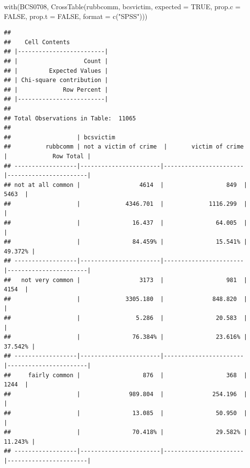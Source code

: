 \documentclass[
]{book}
\newenvironment{Shaded}{\begin{snugshade}}{\end{snugshade}}
\newcommand{\AttributeTok}[1]{\textcolor[rgb]{0.77,0.63,0.00}{#1}}
\newcommand{\ConstantTok}[1]{\textcolor[rgb]{0.00,0.00,0.00}{#1}}
\newcommand{\FunctionTok}[1]{\textcolor[rgb]{0.00,0.00,0.00}{#1}}
\newcommand{\NormalTok}[1]{#1}
\newcommand{\StringTok}[1]{\textcolor[rgb]{0.31,0.60,0.02}{#1}}
\begin{document}
\begin{Shaded}
\begin{Highlighting}[]
\FunctionTok{with}\NormalTok{(BCS0708, }\FunctionTok{CrossTable}\NormalTok{(rubbcomm, bcsvictim, }\AttributeTok{expected =} \ConstantTok{TRUE}\NormalTok{, }\AttributeTok{prop.c =} \ConstantTok{FALSE}\NormalTok{, }\AttributeTok{prop.t =} \ConstantTok{FALSE}\NormalTok{, }\AttributeTok{format =} \FunctionTok{c}\NormalTok{(}\StringTok{"SPSS"}\NormalTok{)))}
\end{Highlighting}
\end{Shaded}

\begin{verbatim}
## 
##    Cell Contents
## |-------------------------|
## |                   Count |
## |         Expected Values |
## | Chi-square contribution |
## |             Row Percent |
## |-------------------------|
## 
## Total Observations in Table:  11065 
## 
##                   | bcsvictim 
##          rubbcomm | not a victim of crime  |       victim of crime  |             Row Total | 
## ------------------|-----------------------|-----------------------|-----------------------|
## not at all common |                 4614  |                  849  |                 5463  | 
##                   |             4346.701  |             1116.299  |                       | 
##                   |               16.437  |               64.005  |                       | 
##                   |               84.459% |               15.541% |               49.372% | 
## ------------------|-----------------------|-----------------------|-----------------------|
##   not very common |                 3173  |                  981  |                 4154  | 
##                   |             3305.180  |              848.820  |                       | 
##                   |                5.286  |               20.583  |                       | 
##                   |               76.384% |               23.616% |               37.542% | 
## ------------------|-----------------------|-----------------------|-----------------------|
##     fairly common |                  876  |                  368  |                 1244  | 
##                   |              989.804  |              254.196  |                       | 
##                   |               13.085  |               50.950  |                       | 
##                   |               70.418% |               29.582% |               11.243% | 
## ------------------|-----------------------|-----------------------|-----------------------|

\end{verbatim}
\end{document}

